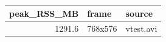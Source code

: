 \begin{tabular}{rll}
\toprule
peak_RSS_MB & frame & source \\
\midrule
1291.6 & 768x576 & vtest.avi \\
\bottomrule
\end{tabular}
